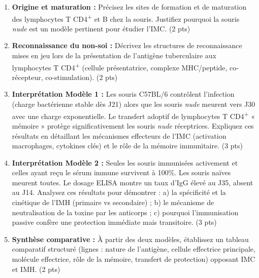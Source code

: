 \documentclass[11pt]{article}
\begin{document}
\begin{exercice}
\begin{enumerate}
    \item \textbf{Origine et maturation :} Précisez les sites de formation et de maturation des lymphocytes T CD4\textsuperscript{+} et B chez la souris. Justifiez pourquoi la souris \textit{nude} est un modèle pertinent pour étudier l'IMC. (2 pts)
    \item \textbf{Reconnaissance du non-soi :} Décrivez les structures de reconnaissance mises en jeu lors de la présentation de l'antigène tuberculaire aux lymphocytes T CD4\textsuperscript{+} (cellule présentatrice, complexe MHC/peptide, co-récepteur, co-stimulation). (2 pts)
    \item \textbf{Interprétation Modèle 1 :} Les souris C57BL/6 contrôlent l'infection (charge bactérienne stable dès J21) alors que les souris \textit{nude} meurent vers J30 avec une charge exponentielle. Le transfert adoptif de lymphocytes T CD4\textsuperscript{+} « mémoire » protège significativement les souris \textit{nude} réceptrices. Expliquez ces résultats en détaillant les mécanismes effecteurs de l'IMC (activation macrophages, cytokines clés) et le rôle de la mémoire immunitaire. (3 pts)
    \item \textbf{Interprétation Modèle 2 :} Seules les souris immunisées activement et celles ayant reçu le sérum immune survivent à 100\%. Les souris naïves meurent toutes. Le dosage ELISA montre un taux d'IgG élevé au J35, absent au J14. Analysez ces résultats pour démontrer : a) la spécificité et la cinétique de l'IMH (primaire vs secondaire) ; b) le mécanisme de neutralisation de la toxine par les anticorps ; c) pourquoi l'immunisation passive confère une protection immédiate mais transitoire. (3 pts)
    \item \textbf{Synthèse comparative :} À partir des deux modèles, établissez un tableau comparatif structuré (lignes : nature de l'antigène, cellule effectrice principale, molécule effectrice, rôle de la mémoire, transfert de protection) opposant IMC et IMH. (2 pts)
\end{enumerate}
\end{exercice}
\end{document}
